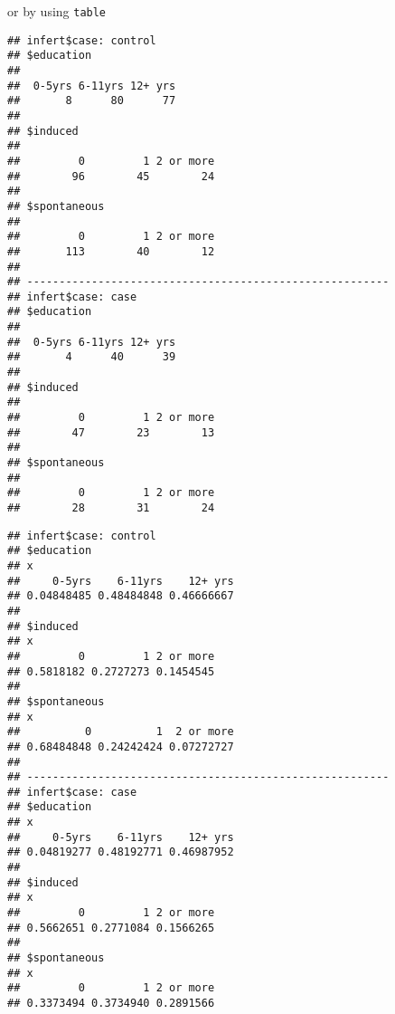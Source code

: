 \documentclass[]{book}
\newenvironment{Shaded}{\begin{snugshade}}{\end{snugshade}}
\newcommand{\KeywordTok}[1]{\textcolor[rgb]{0.13,0.29,0.53}{\textbf{{#1}}}}
\newcommand{\StringTok}[1]{\textcolor[rgb]{0.31,0.60,0.02}{{#1}}}
\newcommand{\NormalTok}[1]{{#1}}
\theoremstyle{definition}
\theoremstyle{definition}
\theoremstyle{remark}
\begin{document}
or by using \texttt{table}

\begin{Shaded}
\end{Shaded}

\begin{verbatim}
## infert$case: control
## $education
## 
##  0-5yrs 6-11yrs 12+ yrs 
##       8      80      77 
## 
## $induced
## 
##         0         1 2 or more 
##        96        45        24 
## 
## $spontaneous
## 
##         0         1 2 or more 
##       113        40        12 
## 
## -------------------------------------------------------- 
## infert$case: case
## $education
## 
##  0-5yrs 6-11yrs 12+ yrs 
##       4      40      39 
## 
## $induced
## 
##         0         1 2 or more 
##        47        23        13 
## 
## $spontaneous
## 
##         0         1 2 or more 
##        28        31        24
\end{verbatim}

\begin{Shaded}
\end{Shaded}

\begin{verbatim}
## infert$case: control
## $education
## x
##     0-5yrs    6-11yrs    12+ yrs 
## 0.04848485 0.48484848 0.46666667 
## 
## $induced
## x
##         0         1 2 or more 
## 0.5818182 0.2727273 0.1454545 
## 
## $spontaneous
## x
##          0          1  2 or more 
## 0.68484848 0.24242424 0.07272727 
## 
## -------------------------------------------------------- 
## infert$case: case
## $education
## x
##     0-5yrs    6-11yrs    12+ yrs 
## 0.04819277 0.48192771 0.46987952 
## 
## $induced
## x
##         0         1 2 or more 
## 0.5662651 0.2771084 0.1566265 
## 
## $spontaneous
## x
##         0         1 2 or more 
## 0.3373494 0.3734940 0.2891566
\end{verbatim}
\end{document}
